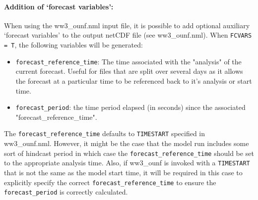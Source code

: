 \paragraph{Addition of `forecast variables':}
When using the ww3\_ounf.nml input file, it is possible to add optional
auxiliary `forecast variables' to the output netCDF file (see ww3\_ounf.nml).
When \texttt{FCVARS = T}, the following variables will be generated:
\begin{itemize}
 \item \texttt{forecast\_reference\_time}: The time associated with the
 "analysis" of the current forecast. Useful for files that are split over
 several days as it allows the forecast at a particular time to be referenced
 back to it's analysis or start time.
 
 \item \texttt{forecast\_period}: the time period elapsed (in seconds)
 since the associated "forecast\_reference\_time".
\end{itemize}

\noindent
The \texttt{forecast\_reference\_time} defaults to \texttt{TIMESTART} specified in
ww3\_ounf.nml. However, it might be the case that the model run includes some
sort of hindcast period in which case the \texttt{forecast\_reference\_time}
should be set to the appropriate analysis time. Also, if ww3\_ounf is invoked
with a \texttt{TIMESTART} that is not the same as the model start time, it will
be required in this case to explicitly specify the correct
\texttt{forecast\_reference\_time} to ensure the \texttt{forecast\_period} is
correctly calculated.

\pb

